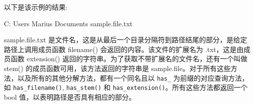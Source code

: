 以下是该示例的结果:

\begin{shell}
C:
Users
Marius
Documents
sample.file.txt
\end{shell}

sample.file.txt 是文件名，这是从最后一个目录分隔符到路径结尾的部分，是给定路径上调用成员函数 filename() 会返回的内容。该文件的扩展名为 .txt，这是由成员函数 extension() 返回的字符串。为了获取不带扩展名的文件名，还有一个叫做 stem() 的成员函数可用，该方法返回的字符串是 sample.file。对于所有这些方法，以及所有的其他分解方法，都有一个同名且以 \verb|has_| 为前缀的对应查询方法，如 \verb|has_filename()|, \verb|has_stem()| 和 \verb|has_extension()|。所有这些方法都返回一个 bool 值，以表明路径是否具有相应的部分。

